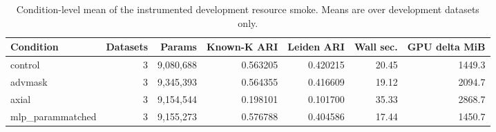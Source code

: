 \begin{table}[ht]
\centering
\caption{Condition-level mean of the instrumented development resource smoke. Means are over development datasets only.}
\label{tab:generated-instrumented-resource-smoke-summary}
\scriptsize
\begin{tabular}{lrrrrrr}
\toprule
Condition & Datasets & Params & Known-K ARI & Leiden ARI & Wall sec. & GPU delta MiB \\
\midrule
control & 3 & 9,080,688 & 0.563205 & 0.420215 & 20.45 & 1449.3 \\
advmask & 3 & 9,345,393 & 0.564355 & 0.416609 & 19.12 & 2094.7 \\
axial & 3 & 9,154,544 & 0.198101 & 0.101700 & 35.33 & 2868.7 \\
mlp\_parammatched & 3 & 9,155,273 & 0.576788 & 0.404586 & 17.44 & 1450.7 \\
\bottomrule
\end{tabular}
\end{table}

